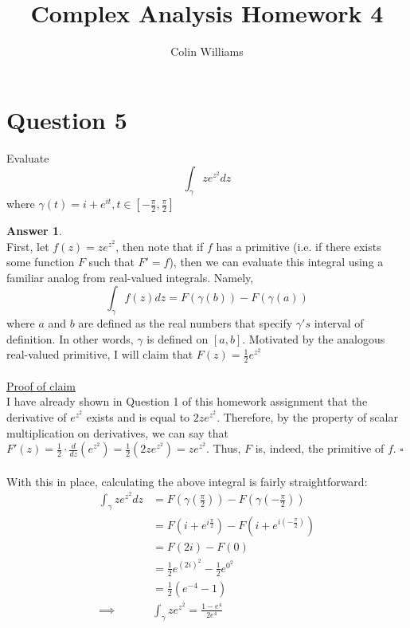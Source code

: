 \documentclass[10pt,a4paper]{article}
\title{Complex Analysis Homework 4}
\author{Colin Williams}
\theoremstyle{definition}
\newtheorem*{answer*}{Answer}
\begin{document}
\maketitle

\section*{Question 5}

Evaluate
\[\int_{\gamma} ze^{z^2}dz\]
where $\gamma(t) = i + e^{it}, t \in [-\frac{\pi}{2}, \frac{\pi}{2}]$
\\
\begin{answer*}{$ $}
\\First, let $\displaystyle f(z) = ze^{z^2}$, then note that if $f$ has a primitive (i.e. if there exists some function $F$ such that $F' = f$), then we can evaluate this integral using a familiar analog from real-valued integrals. Namely, 
\[\int_{\gamma} f(z)dz = F(\gamma(b)) - F(\gamma(a))\]
where $a$ and $b$ are defined as the real numbers that specify $\gamma 's$ interval of definition. In other words, $\gamma$ is defined on $[a,b]$. Motivated by the analogous real-valued primitive, I will claim that $F(z) = \frac{1}{2}e^{z^2}$
\\
\\\underline{Proof of claim}
\\I have already shown in Question 1 of this homework assignment that the derivative of $e^{z^2}$ exists and is equal to $2ze^{z^2}$. Therefore, by the property of scalar multiplication on derivatives, we can say that $F'(z) = \frac{1}{2}\cdot \frac{d}{dz}(e^{z^2}) = \frac{1}{2}(2ze^{z^2}) = ze^{z^2}$. Thus, $F$ is, indeed, the primitive of $f$. $\square$
\\
\\With this in place, calculating the above integral is fairly straightforward:
\begin{align*}
\int_{\gamma} ze^{z^2}dz &= F\left(\gamma\left(\frac{\pi}{2}\right)\right) - F\left(\gamma\left(-\frac{\pi}{2}\right)\right)\\
&= F\left(i + e^{i\frac{\pi}{2}}\right) - F\left(i + e^{i(-\frac{\pi}{2})}\right)\\
&= F(2i) - F(0)\\
&= \frac{1}{2}e^{(2i)^2} - \frac{1}{2}e^{0^2}\\
&= \frac{1}{2}(e^{-4} - 1)\\
\implies &\boxed{\int_{\gamma}ze^{z^2} = \frac{1 - e^4}{2e^4} }
\end{align*}
\end{answer*}
\end{document}
